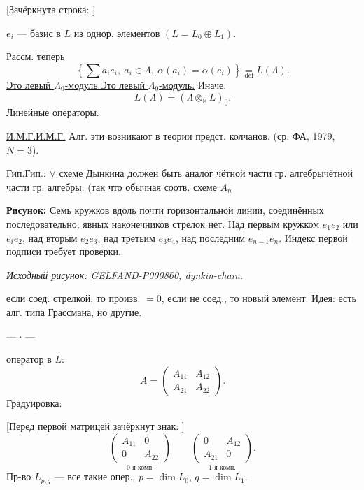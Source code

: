 \documentclass[11pt]{article}
\theoremstyle{definition}
\theoremstyle{remark}
\newcommand{\Unclear}[3]{%
  \begingroup\color{orange!70!black}%
  [Unresolved reading #1/#2: #3]\endgroup%
}
\newcommand{\SourceFigure}[3]{%
  \par\begingroup\color{blue!60!black}\textbf{\hyperref[#1:source-page]{Source figure #1/#2}:} #3%
  \par\textit{Consult the authoritative scan at this locator.}\endgroup\par%
}
\renewcommand{\Unclear}[3]{%
  \begingroup\color{orange!65!black}%
  \ifmmode\text{[неясно: #3]}\else[неясно: #3]\fi\endgroup%
}
\renewcommand{\SourceFigure}[3]{%
  \par\begingroup\color{blue!55!black}\textbf{Рисунок:} #3%
  \par{\small\textit{Исходный рисунок: \hyperref[#1:source-page]{#1}, #2.}}%
  \endgroup\par%
}
\let\DiplomaticMathUnderline\underline
\renewcommand{\underline}[1]{\ifmmode\DiplomaticMathUnderline{#1}\else\uline{#1}\fi}
\begin{document}
[Зачёркнута строка: \Unclear{GELFAND-P000860}{cancelled-definition}{$(2)$? $L(\Lambda)=L\otimes_{\mathbb{K}}\Lambda$?}]

$e_i$ --- базис в $L$ из однор. элементов
$(L=L_0\oplus L_1)$.

Рассм. теперь
\begin{equation*}
\left\{\sum a_i e_i,\ a_i\in\Lambda,\ \alpha(a_i)=\alpha(e_i)\right\}
\underset{\mathrm{def}}{=}L(\Lambda). \tag{2}
\end{equation*}
\underline{Это левый $\Lambda_0$-модуль.} Иначе:
\begin{equation*}
L(\Lambda)=(\Lambda\otimes_{\mathbb{K}}L)_{\bar 0}. \tag{2'}
\end{equation*}
Линейные операторы.

\underline{И.М.Г.} Алг. эти возникают в теории предст. колчанов.
(ср. ФА, 1979, $N=3$).

\underline{Гип.}: $\forall$ схеме Дынкина должен быть аналог
\underline{чётной части гр. алгебры}.
(так что обычная соотв. схеме $A_n$

\SourceFigure{GELFAND-P000860}{dynkin-chain}{Семь кружков вдоль почти горизонтальной линии, соединённых последовательно; явных наконечников стрелок нет. Над первым кружком $e_1e_2$ или $e_i e_2$, над вторым $e_2e_3$, над третьим $e_3e_4$, над последним $e_{n-1}e_n$. Индекс первой подписи требует проверки.}

если соед. стрелкой, то произв. $=0$, если не соед., то новый элемент.
Идея: есть алг. типа Грассмана, но другие.
\begin{center}--- $\cdot$ ---\end{center}

оператор в $L$:
\begin{equation*}
A=\begin{pmatrix}A_{11}&A_{12}\\A_{21}&A_{22}\end{pmatrix}. \tag{3}
\end{equation*}
Градуировка:

[Перед первой матрицей зачёркнут знак:
\Unclear{GELFAND-P000860}{grading-cancellation}{$A$?}]
\begin{equation*}
\underset{\text{0-я комп.}}{\begin{pmatrix}A_{11}&0\\0&A_{22}\end{pmatrix}}
\qquad
\underset{\text{1-я комп.}}{\begin{pmatrix}0&A_{12}\\A_{21}&0\end{pmatrix}}. \tag{4}
\end{equation*}
Пр-во $L_{p,q}$ --- все такие опер., $p=\dim L_0$, $q=\dim L_1$.
\end{document}
